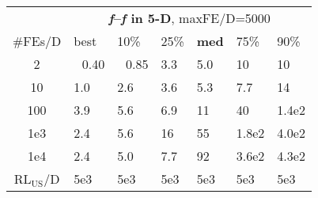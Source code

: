 \begin{tabular}{c|llllll}
 & \multicolumn{6}{|c}{\textbf{\textit{f}\raisebox{-0.35ex}{1}--\textit{f}\raisebox{-0.35ex}{24} in 5-D}, maxFE/D=5000}\\
\#FEs/D & best & 10\% & 25\% & \textbf{med} & 75\% & 90\%\\
2 & ~\,0.40 & ~\,0.85 & \hspace*{1ex}3.3 & \hspace*{1ex}5.0 & 10 & 10\\
10 & \hspace*{1ex}1.0 & \hspace*{1ex}2.6 & \hspace*{1ex}3.6 & \hspace*{1ex}5.3 & \hspace*{1ex}7.7 & 14\\
100 & \hspace*{1ex}3.9 & \hspace*{1ex}5.6 & \hspace*{1ex}6.9 & 11 & 40 & 1.4e2\\
1e3 & \hspace*{1ex}2.4 & \hspace*{1ex}5.6 & 16 & 55 & 1.8e2 & 4.0e2\\
1e4 & \hspace*{1ex}2.4 & \hspace*{1ex}5.0 & \hspace*{1ex}7.7 & 92 & 3.6e2 & 4.3e2\\
$\text{RL}_{\text{US}}$/D & 5e3 & 5e3 & 5e3 & 5e3 & 5e3 & 5e3
\end{tabular}
